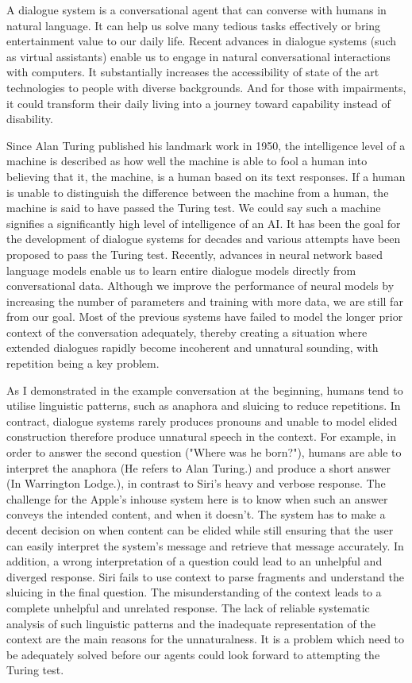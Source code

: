 \documentclass[bsc,frontabs,twoside,singlespacing,parskip,deptreport]{infthesis}     %
\begin{document}
A dialogue system is a conversational agent that can converse with humans in natural language. It can help us solve many tedious tasks effectively or bring entertainment value to our daily life. Recent advances in dialogue systems (such as virtual assistants\cite{alexa,cortana,siri}) enable us to engage in natural conversational interactions with computers. It substantially increases the accessibility of state of the art technologies to people with diverse backgrounds. And for those with impairments, it could transform their daily living into a journey toward capability instead of disability.

Since Alan Turing published his landmark work in 1950\cite{turing1950computing}, the intelligence level of a machine is described as how well the machine is able to fool a human into believing that it, the machine, is a human based on its text responses. If a human is unable to distinguish the difference between the machine from a human, the machine is said to have passed the Turing test. We could say such a machine signifies a significantly high level of intelligence of an AI. It has been the goal for the development of dialogue systems for decades and various attempts have been proposed to pass the Turing test. Recently, advances in neural network based language models enable us to learn entire dialogue models directly from conversational data. Although we improve the performance of neural models by increasing the number of parameters and training with more data, we are still far from our goal. Most of the previous systems have failed to model the longer prior context of the conversation adequately, thereby creating a situation where extended dialogues rapidly become incoherent and unnatural sounding, with repetition being a key problem. 

As I demonstrated in the example conversation at the beginning, humans tend to utilise linguistic patterns, such as anaphora and sluicing to reduce repetitions. In contract, dialogue systems rarely produces pronouns and unable to model elided construction therefore produce unnatural speech in the context. For example, in order to answer the second question ("Where was he born?"), humans are able to interpret the anaphora (He refers to Alan Turing.) and produce a short answer (In Warrington Lodge.), in contrast to Siri's heavy and verbose response. The challenge for the Apple's inhouse system here is to know when such an answer conveys the intended content, and when it doesn't. The system has to make a decent decision on when content can be elided while still ensuring that the user can easily interpret the system's message and retrieve that message accurately. In addition, a wrong interpretation of a question could lead to an unhelpful and diverged response. Siri fails to use context to parse fragments and understand the sluicing in the final question. The misunderstanding of the context leads to a complete unhelpful and unrelated response. The lack of reliable systematic analysis of such linguistic patterns and the inadequate representation of the context are the main reasons for the unnaturalness. It is a problem which need to be adequately solved before our agents could look forward to attempting the Turing test.
\end{document}
